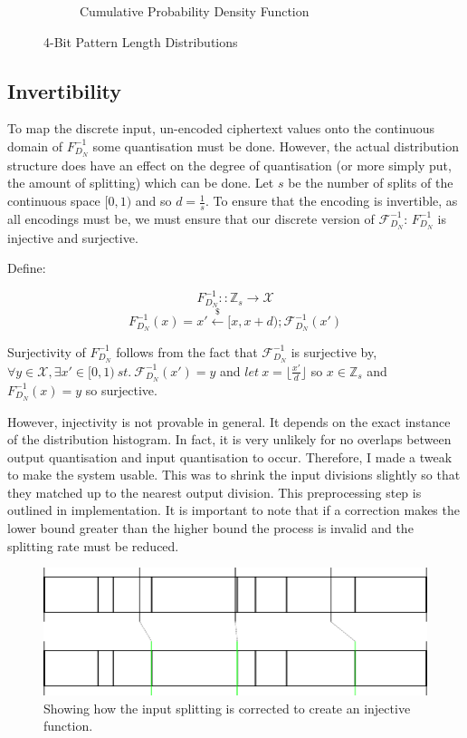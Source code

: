 \documentclass[ %
                    author={Samuel Russell},
                supervisor={Prof. Bogdan Warinschi},
                    degree={MEng},
                     title={Innocuous Ciphertexts},
                  subtitle={The DE-CENSOR Scheme},
                      type={Research},
                      year={2018} ]{dissertation}
\begin{document}
\begin{figure}[h]
\begin{subfigure}[b]{.49\linewidth}
\begin{tikzpicture}
\end{tikzpicture}
\caption{Cumulative Probability Density Function}
\label{fig:cum_dist_pat4}
\end{subfigure}
\caption{4-Bit Pattern Length Distributions}
\label{fig:cum_conv}
\end{figure}



\subsection{Invertibility}\label{invertibility}

To map the discrete input, un-encoded ciphertext values onto the continuous domain of $F^{-1}_{D_N}$ some quantisation must be done.
However, the actual distribution structure does have an effect on the degree of quantisation (or more simply put, the amount of splitting) which can be done.
Let $s$ be the number of splits of the continuous space $[0,1)$ and so $d = \frac{1}{s}$.
To ensure that the encoding is invertible, as all encodings must be, we must ensure that our discrete version of $\mathcal{F}^{-1}_{D_N}$: $F^{-1}_{D_N}$ is injective and surjective.

Define:

$$F^{-1}_{D_N} :: \mathbb{Z}_s \rightarrow \mathcal{X}$$
$$F^{-1}_{D_N}(x) = x' \xleftarrow{\$} [x, x+d); \mathcal{F}^{-1}_{D_N}(x')$$

Surjectivity of $F^{-1}_{D_N}$ follows from the fact that $\mathcal{F}^{-1}_{D_N}$ is surjective by, $\forall y \in \mathcal{X}, \exists x' \in [0,1)\ st.\ \mathcal{F}^{-1}_{D_N}(x') = y$ and $ let\ x = \lfloor \frac{x'}{d} \rfloor$ so $x \in \mathbb{Z}_s$ and $F^{-1}_{D_N}(x) = y$ so surjective.

However, injectivity is not provable in general. It depends on the exact instance of the distribution histogram.
In fact, it is very unlikely for no overlaps between output quantisation and input quantisation to occur.
Therefore, I made a tweak to make the system usable.
This was to shrink the input divisions slightly so that they matched up to the nearest output division.
This preprocessing step is outlined in implementation.
It is important to note that if a correction makes the lower bound greater than the higher bound the process is invalid and the splitting rate must be reduced.

\begin{figure}[h]
\centering
\includegraphics[scale=.9]{correction}
\caption{Showing how the input splitting is corrected to create an injective function.}
\label{correction}
\end{figure}
\end{document}
